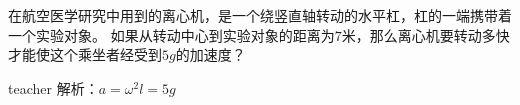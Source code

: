 \begin{example}
	在航空医学研究中用到的离心机，是一个绕竖直轴转动的水平杠，杠的一端携带着一个实验对象。
	如果从转动中心到实验对象的距离为$7$米，那么离心机要转动多快才能使这个乘坐者经受到$5g$的加速度？
	\begin{taggedblock}{teacher}
		\newline
		解析：$a=\omega^2l=5g$
	\end{taggedblock}
\end{example}



